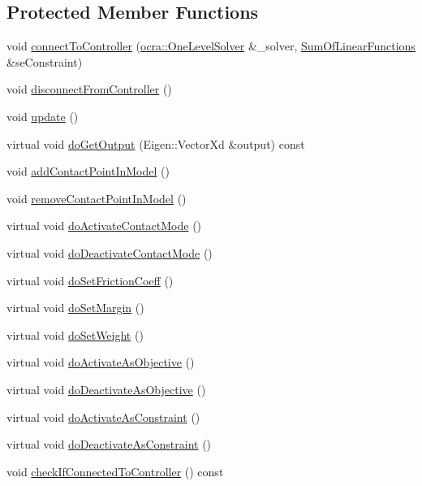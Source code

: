 \subsection*{Protected Member Functions}
\begin{DoxyCompactItemize}
\item 
void \hyperlink{classgocra_1_1GHCJTTask_a021f21b19d0d9de1c067192166f852e6}{connect\+To\+Controller} (\hyperlink{classocra_1_1OneLevelSolver}{ocra\+::\+One\+Level\+Solver} \&\+\_\+solver, \hyperlink{classocra_1_1SumOfLinearFunctions}{Sum\+Of\+Linear\+Functions} \&se\+Constraint)
\item 
void \hyperlink{classgocra_1_1GHCJTTask_a5caec6472d19926a2448779fa629c9d8}{disconnect\+From\+Controller} ()
\item 
void \hyperlink{classgocra_1_1GHCJTTask_a5c2a49cb14720321fdfb91c899f87dac}{update} ()
\item 
virtual void \hyperlink{classgocra_1_1GHCJTTask_a9f2cd769e33b12a5885ecd7b78a41185}{do\+Get\+Output} (Eigen\+::\+Vector\+Xd \&output) const
\item 
void \hyperlink{classgocra_1_1GHCJTTask_aee61104908f043c77611e2b3b573d103}{add\+Contact\+Point\+In\+Model} ()
\item 
void \hyperlink{classgocra_1_1GHCJTTask_a818c6077d8325b963e3c72e41a03fe86}{remove\+Contact\+Point\+In\+Model} ()
\item 
virtual void \hyperlink{classgocra_1_1GHCJTTask_a22fe7a1bd0de44d7f51a250baf7796a8}{do\+Activate\+Contact\+Mode} ()
\item 
virtual void \hyperlink{classgocra_1_1GHCJTTask_a20b391cbb8d62237216624db57d0f634}{do\+Deactivate\+Contact\+Mode} ()
\item 
virtual void \hyperlink{classgocra_1_1GHCJTTask_ab05c45917bde9d97f166356f96ee7f95}{do\+Set\+Friction\+Coeff} ()
\item 
virtual void \hyperlink{classgocra_1_1GHCJTTask_ab2a09a00c8e1a2ffef7bd80b40aaeee1}{do\+Set\+Margin} ()
\item 
virtual void \hyperlink{classgocra_1_1GHCJTTask_a4966871ab447bff90495c057725e7122}{do\+Set\+Weight} ()
\item 
virtual void \hyperlink{classgocra_1_1GHCJTTask_a81a6df22509e5e98902e5ac33a43dfed}{do\+Activate\+As\+Objective} ()
\item 
virtual void \hyperlink{classgocra_1_1GHCJTTask_a65593378b928021c5506e2eb6dc9a9c5}{do\+Deactivate\+As\+Objective} ()
\item 
virtual void \hyperlink{classgocra_1_1GHCJTTask_a3fbf21222cf652bb5563b72416a97cda}{do\+Activate\+As\+Constraint} ()
\item 
virtual void \hyperlink{classgocra_1_1GHCJTTask_a2274fda92c62d88a6b4b35286606c41c}{do\+Deactivate\+As\+Constraint} ()
\item 
void \hyperlink{classgocra_1_1GHCJTTask_a70e6514d810197ee94af36959061982e}{check\+If\+Connected\+To\+Controller} () const
\end{DoxyCompactItemize}
